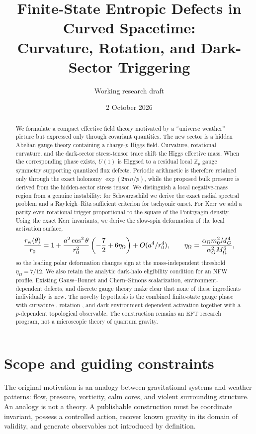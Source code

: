 \documentclass[11pt]{article}
\title{Finite-State Entropic Defects in Curved Spacetime:\\
Curvature, Rotation, and Dark-Sector Triggering}
\author{Working research draft}
\date{2 October 2026}
\begin{document}
\maketitle

\begin{abstract}
We formulate a compact effective field theory motivated by a ``universe weather'' picture but expressed only through covariant quantities.  The new sector is a hidden Abelian gauge theory containing a charge-$p$ Higgs field.  Curvature, rotational curvature, and the dark-sector stress-tensor trace shift the Higgs effective mass.  When the corresponding phase exists, $U(1)$ is Higgsed to a residual local $\mathbb Z_p$ gauge symmetry supporting quantized flux defects.  Periodic arithmetic is therefore retained only through the exact holonomy $\exp(2\pi i n/p)$, while the proposed bulk pressure is derived from the hidden-sector stress tensor.  We distinguish a local negative-mass region from a genuine instability: for Schwarzschild we derive the exact radial spectral problem and a Rayleigh--Ritz sufficient criterion for tachyonic onset.  For Kerr we add a parity-even rotational trigger proportional to the square of the Pontryagin density.  Using the exact Kerr invariants, we derive the slow-spin deformation of the local activation surface,
\[
\frac{r_{\rm w}(\theta)}{r_0}=1+\frac{a^2\cos^2\theta}{r_0^2}\left(-\frac72+6\eta_\Omega\right)+O(a^4/r_0^4),
\qquad
\eta_\Omega=\frac{\alpha_\Omega m_0^2 M_G^4}{\alpha_G^2M_\Omega^6},
\]
so the leading polar deformation changes sign at the mass-independent threshold $\eta_\Omega=7/12$.  We also retain the analytic dark-halo eligibility condition for an NFW profile.  Existing Gauss--Bonnet and Chern--Simons scalarization, environment-dependent defects, and discrete gauge theory make clear that none of these ingredients individually is new.  The novelty hypothesis is the combined finite-state gauge phase with curvature-, rotation-, and dark-environment-dependent activation together with a $p$-dependent topological observable.  The construction remains an EFT research program, not a microscopic theory of quantum gravity.
\end{abstract}

\section{Scope and guiding constraints}

The original motivation is an analogy between gravitational systems and weather patterns: flow, pressure, vorticity, calm cores, and violent surrounding structure.  An analogy is not a theory.  A publishable construction must be coordinate invariant, possess a controlled action, recover known gravity in its domain of validity, and generate observables not introduced by definition.
\end{document}
